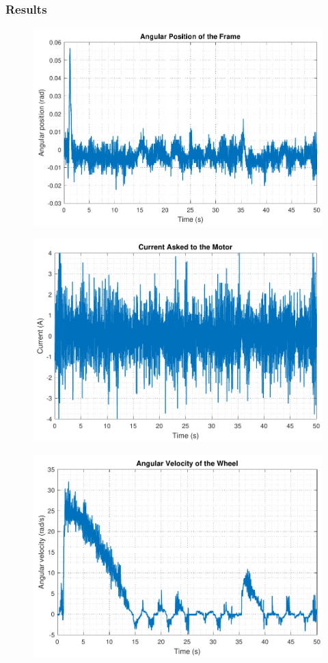 \subsubsection{Results}
%
\begin{figure}
	\centering
	\includegraphics[scale=.65]{figures/SISOControllerPosition}
	\label{positionTestTustinPre}
\end{figure}
%
\begin{figure}
	\centering
	\includegraphics[scale=.65]{figures/SISOControllerCurrent}
	\label{torqueTestTustinPre}
\end{figure}
%
\begin{figure}
	\centering
	\includegraphics[scale=.65]{figures/SISOControllerWheel}
	\label{wheelTestTustinPre}
\end{figure}


